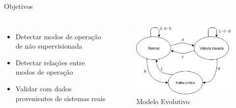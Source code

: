 \begin{frame}{Objetivos}
    \begin{columns}
        	\begin{itemize}
        	    \item Detectar modos de operação de não supervisionada
        	    \item Detectar relações entre modos de operação
        	    \item Validar com dados provenientes de sistemas reais
        	\end{itemize}
    	
        	\begin{figure}
        	    \centering
        	    \includegraphics[width=\textwidth,height=\textheight,keepaspectratio]{figuras/grafo_yuri.png}
        	    \caption{Modelo Evolutivo}
        	    \label{fig:grafo}
        	\end{figure}
    \end{columns}
\end{frame}


